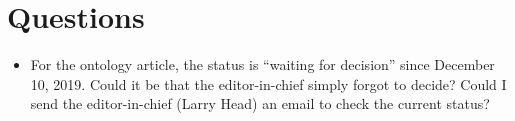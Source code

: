 \documentclass[10pt,final,a4paper,oneside,onecolumn]{article}
\begin{document}
\section{Questions}

\begin{itemize}
	\item For the ontology article, the status is ``waiting for decision'' since December 10, 2019. Could it be that the editor-in-chief simply forgot to decide? Could I send the editor-in-chief (Larry Head) an email to check the current status?
\end{itemize}


\printbibliography

\clearpage

\end{document}
